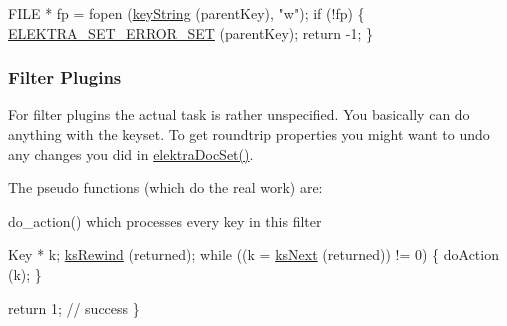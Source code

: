 \begin{DoxyCodeInclude}
        FILE * fp = fopen (\hyperlink{group__keyvalue_ga880936f2481d28e6e2acbe7486a21d05}{keyString} (parentKey), \textcolor{stringliteral}{"w"});
        \textcolor{keywordflow}{if} (!fp)
        \{
                \hyperlink{group__plugin_gaf526686f01dbacd68671732aad4b5d76}{ELEKTRA\_SET\_ERROR\_SET} (parentKey);
                \textcolor{keywordflow}{return} -1;
        \}
\end{DoxyCodeInclude}
 \hypertarget{group__plugin_filter}{}\subsubsection{Filter Plugins}\label{group__plugin_filter}
For filter plugins the actual task is rather unspecified. You basically can do anything with the keyset. To get roundtrip properties you might want to undo any changes you did in \hyperlink{group__plugin_gae65781a1deb34efc79c8cb9d9174842c}{elektra\+Doc\+Set()}.

The pseudo functions (which do the real work) are\+:
\begin{DoxyItemize}
\item do\+\_\+action() which processes every key in this filter
\end{DoxyItemize}


\begin{DoxyCodeInclude}
        Key * k;
        \hyperlink{group__keyset_gabe793ff51f1728e3429c84a8a9086b70}{ksRewind} (returned);
        \textcolor{keywordflow}{while} ((k = \hyperlink{group__keyset_ga317321c9065b5a4b3e33fe1c399bcec9}{ksNext} (returned)) != 0)
        \{
                doAction (k);
        \}

        \textcolor{keywordflow}{return} 1; \textcolor{comment}{// success}
\}
\end{DoxyCodeInclude}


